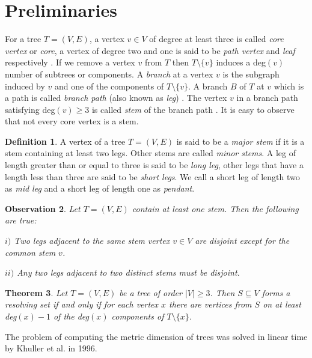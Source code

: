 \documentclass{article}
\newtheorem{thm}{Theorem}[section]
\newtheorem{obs}[thm]{Observation}
\theoremstyle{definition}
\newtheorem{defn}[thm]{Definition}
\numberwithin{equation}{section}
\begin{document}
\section{Preliminaries}
  For a tree $T=(V, E)$, a vertex $v\in V$ of degree at least three is called {\em core vertex} or {\em core}, a vertex of degree two and one is said to be {\em path vertex} and {\em leaf} respectively  \cite{AE}. If we remove a vertex $v$ from $T$ then $T\setminus\{v\}$ induces a deg$(v)$ number of subtrees or components.
A {\em branch} at a vertex $v$ is the subgraph induced by $v$ and one of the components of $T\setminus \{v\}$. A branch $B$ of $T$ at $v$ which is a path is called {\em branch path} (also known as {\em leg}) \cite{S}. The vertex $v$ in a branch path satisfying deg$(v)\geq 3$ is called {\em stem} of the branch path \cite{HMSW}. It is easy to observe that not every core vertex is a stem.
  
\begin{defn}\label{majorstem}
A vertex of a tree $T=(V, E)$ is said to be a {\em major stem} if it is a stem containing at least two legs. Other stems are called {\em minor stems}. A leg of length greater than or equal to three is said to be {\em long leg}, other legs that have a length less than three are said to be {\em short legs}. We call a short leg of length two as {\em mid leg} and a short leg of length one as {\em pendant}. 
\end{defn}
 

\begin{obs}
Let $T=(V, E)$ contain at least one stem. Then the following are true:

$i)$ Two legs adjacent to the same stem vertex $v\in V$ are disjoint except for the common stem $v$.

$ii)$ Any two legs adjacent to two distinct stems must be disjoint. 
\end{obs}



\begin{thm} \cite{S}\label{component}
Let $T=(V,E)$ be a tree of order $|V|\geq 3$. Then $S\subseteq V$ forms a resolving set if and only if for each vertex $x$ there are vertices from $S$ on at least deg$(x)-1$ of the deg$(x)$ components of $T\setminus\{x\}$.
\end{thm}



\noindent The problem of computing the metric dimension of trees was solved in linear time by Khuller et al. \cite{K} in 1996.
\end{document}
